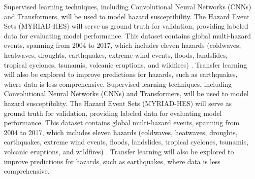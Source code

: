 Supervised learning techniques, including Convolutional Neural Networks (CNNs) and Transformers, will be used to model hazard susceptibility. The Hazard Event Sets (MYRIAD-HES) will serve as ground truth for validation, providing labeled data for evaluating model performance. This dataset contains global multi-hazard events, spanning from 2004 to 2017, which includes eleven hazards (coldwaves, heatwaves, droughts, earthquakes, extreme wind events, floods, landslides, tropical cyclones, tsunamis, volcanic eruptions, and wildfires) \cite{claassen_2023_myriad}. Transfer learning will also be explored to improve predictions for hazards, such as earthquakes, where data is less comprehensive.
Supervised learning techniques, including Convolutional Neural Networks (CNNs) and Transformers, will be used to model hazard susceptibility. The Hazard Event Sets (MYRIAD-HES) will serve as ground truth for validation, providing labeled data for evaluating model performance. This dataset contains global multi-hazard events, spanning from 2004 to 2017, which includes eleven hazards (coldwaves, heatwaves, droughts, earthquakes, extreme wind events, floods, landslides, tropical cyclones, tsunamis, volcanic eruptions, and wildfires) \cite{claassen_2023_myriad}. Transfer learning will also be explored to improve predictions for hazards, such as earthquakes, where data is less comprehensive.


